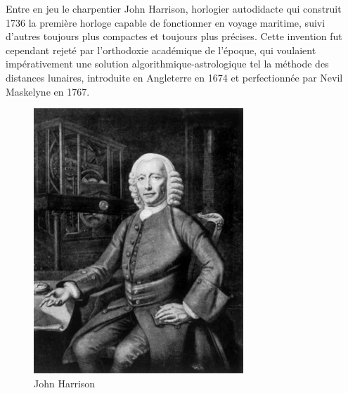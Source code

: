 Entre en jeu le charpentier John Harrison, horlogier autodidacte qui construit 1736 la première horloge capable de fonctionner en voyage maritime, suivi d'autres toujours plus compactes et toujours plus précises. Cette invention fut cependant rejeté par l'orthodoxie académique de l'époque, qui voulaient impérativement une solution algorithmique-astrologique tel la méthode des distances lunaires, introduite en Angleterre en 1674 et perfectionnée par Nevil Maskelyne en 1767\cite{history-longitude}.

\begin{minipage}[H]{0.49\linewidth}
  \begin{figure}[H]
  \centering
  \includegraphics[height=0.15\paperheight]{../resources/illustrations/jharrison}
  \caption{John Harrison}
  \end{figure}
\end{minipage}
